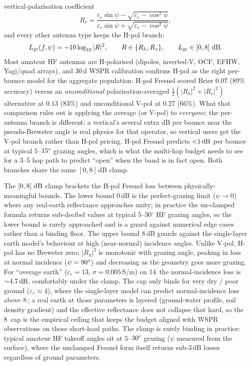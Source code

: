 \documentclass[11pt,a4paper]{article}
\newcommand{\SI}[2]{#1\,\text{#2}}
\newcommand{\si}[1]{\text{#1}}
\newcommand{\dB}{\text{dB}}
\newcommand{\MHz}{\text{MHz}}
\newcommand{\degree}{\ensuremath{{}^\circ}}
\begin{document}
vertical-polarisation coefficient
\begin{equation}
  R_v = \frac{\varepsilon_c \sin\psi - \sqrt{\varepsilon_c - \cos^2\psi}}
             {\varepsilon_c \sin\psi + \sqrt{\varepsilon_c - \cos^2\psi}},
\end{equation}
and every other antenna type keeps the H-pol branch:
\begin{equation}\label{eq:lgr}
  L_{\text{gr}}(f, \psi) = -10\log_{10}|R|^2,
  \qquad R \in \{R_h, R_v\},
  \qquad L_{\text{gr}} \in [0, 8]~\si{\dB}.
\end{equation}
Most amateur HF antennas are H-polarised (dipoles, inverted-V, OCF,
EFHW, Yagi/quad arrays), and 30\,d WSPR calibration confirms H-pol
as the right per-bounce model for the aggregate population: H-pol
Fresnel scored Brier $0.07$
(89\% accuracy) versus an \emph{unconditional} polarisation-averaged
$\tfrac{1}{2}(|R_h|^2 + |R_v|^2)$ alternative at $0.13$ (83\%) and
unconditional V-pol at $0.27$ (66\%).  What that comparison rules
out is applying the average (or V-pol) to \emph{everyone}; the
per-antenna branch is different: a vertical's
several extra dB per bounce near the pseudo-Brewster angle is real
physics for that operator, so vertical users get the V-pol branch
rather than H-pol pricing.  H-pol Fresnel predicts
${<}\SI{1}{\dB}$
per bounce at typical $5$--$15\text{\textdegree}$ grazing angles,
which is what the multi-hop budget needs to see for a 3--5 hop
path to predict ``open'' when the band is in fact open.  Both
branches share the same $[0, 8]$\,dB clamp.

The $[0, 8]~\si{\dB}$ clamp brackets the H-pol Fresnel loss
between physically-meaningful bounds.  The lower bound $0$\,dB is
the perfect-grazing limit ($\psi \to 0$) where any real-earth
reflectance approaches unity; in practice the un-clamped formula
returns sub-decibel values at typical $5$--$30\degree$ HF
grazing angles, so the lower bound is rarely approached and is a
guard against numerical edge cases rather than a binding floor.
The upper bound $8$\,dB guards against the single-layer earth
model's behaviour at high (near-normal) incidence angles. Unlike
V-pol, H-pol has no Brewster zero; $|R_h|^2$ is monotonic with
grazing angle, peaking in loss at normal incidence
($\psi = 90\text{\textdegree}$) and decreasing as the geometry
goes more grazing. For ``average earth''
($\varepsilon_r = 13$, $\sigma = \SI{0.005}{S/m}$) on \SI{14}{\MHz}
the normal-incidence loss is ${\sim}\SI{4.7}{\dB}$, comfortably
under the clamp. The cap only binds for very dry / poor ground
($\varepsilon_r \approx 4$), where the single-layer model can
predict normal-incidence loss above \SI{8}{\dB}; a real earth at
those parameters is layered (ground-water profile, soil density
gradient) and the effective reflectance does not collapse that
hard, so the \SI{8}{\dB} cap is the empirical ceiling that keeps
the budget aligned with WSPR observations on those short-haul
paths. The clamp is rarely binding in practice: typical amateur HF
takeoff angles sit at $5$--$30\text{\textdegree}$ grazing
($\psi$ measured from the surface), where the unclamped Fresnel
form itself returns sub-3\,dB losses regardless of ground
parameters.
\end{document}
